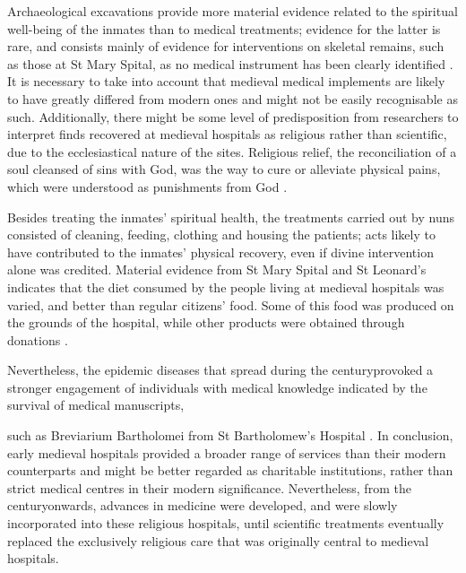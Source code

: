 Archaeological excavations provide more material evidence related to the spiritual well-being of the inmates than to medical treatments; evidence for the latter is rare, and consists mainly of evidence for interventions on skeletal remains, such as those at St Mary Spital, as no medical instrument has been clearly identified \parencite[65,76]{Bowers_2007}. 
It is necessary to take into account that medieval medical implements are likely to have greatly differed from modern ones and might not be easily recognisable as such. Additionally, there might be some level of predisposition from researchers to interpret finds recovered at medieval hospitals as religious rather than scientific, due to the ecclesiastical nature of the sites. 
Religious relief, the reconciliation of a soul cleansed of sins with God, was the way to cure or alleviate physical pains, which were understood as punishments from God \parencites[12-13,96]{Biller_2001}[42-43]{Rawcliffe_1995}. 

Besides treating the inmates’ spiritual health, the treatments carried out by nuns consisted of cleaning, feeding, clothing and housing the patients; acts likely to have contributed to the inmates’ physical recovery, even if divine intervention alone was credited. Material evidence from St Mary Spital and St Leonard’s indicates that the diet consumed by the people living at medieval hospitals was varied, and better than regular citizens’ food. Some of this food was produced on the grounds of the hospital, while other products were obtained through donations \parencites[76]{Egan_2007}[208]{Malcom_2014}.

Nevertheless, the epidemic diseases that spread during the  century\AD provoked a stronger engagement of individuals with medical knowledge indicated by the survival of medical manuscripts, 

such as Breviarium Bartholomei from St Bartholomew’s Hospital \parencite[6,16-22]{Stell_1996}. 
In conclusion, early medieval hospitals provided a broader range of services than their modern counterparts and might be better regarded as charitable institutions, rather than strict medical centres in their modern significance. Nevertheless, from the  century\AD onwards, advances in medicine were developed, and were slowly incorporated into these religious hospitals, until scientific treatments eventually replaced the exclusively religious care that was originally central to medieval hospitals. 


\IJSRAclosing%
%